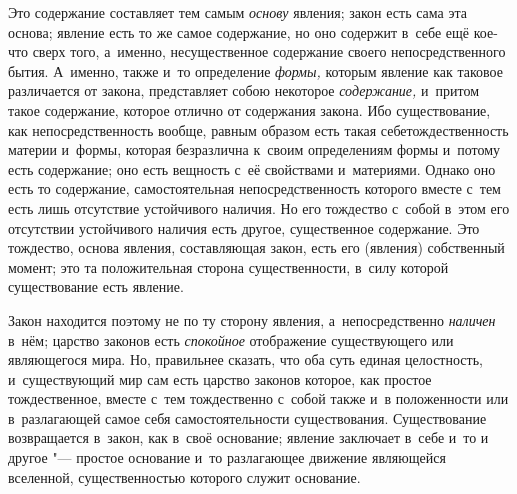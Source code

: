 Это содержание составляет тем самым {\em основу}
явления; закон есть сама эта основа; явление есть то же самое содержание,
но оно содержит в~себе ещё кое-что сверх того, а~именно, несущественное
содержание своего непосредственного бытия. А~именно, также и~то определение
{\em формы,} которым явление как таковое различается от
закона, представляет собою некоторое {\em содержание,}
и~притом такое содержание, которое отлично от содержания закона. Ибо
существование, как непосредственность вообще, равным образом есть такая
себетождественность материи и~формы, которая безразлична к~своим
определениям формы и~потому есть содержание; оно есть вещность с~её
свойствами и~материями. Однако оно есть то содержание, самостоятельная
непосредственность которого вместе с~тем есть лишь отсутствие устойчивого
наличия. Но его тождество с~собой в~этом его отсутствии устойчивого наличия
есть другое, существенное содержание. Это тождество, основа явления,
составляющая закон, есть его (явления) собственный момент; это та
положительная сторона существенности, в~силу которой существование есть
явление.

Закон находится поэтому не по ту сторону явления, а~непосредственно
{\em наличен} в~нём; царство законов есть
{\em спокойное} отображение существующего или
являющегося мира. Но, правильнее сказать, что оба суть единая целостность,
и~существующий мир сам есть царство законов которое, как простое
тождественное, вместе с~тем тождественно с~собой также и~в положенности или
в~разлагающей самое себя самостоятельности существования. Существование
возвращается в~закон, как в~своё основание; явление заключает в~себе и~то и
другое "--- простое основание и~то разлагающее движение являющейся вселенной,
существенностью которого служит основание.

